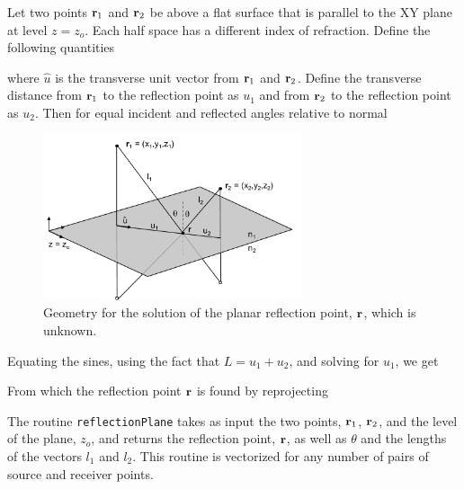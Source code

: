 Let two points $\mathbf{r}_1$ and $\mathbf{r}_2$ be above a flat surface that is parallel to the XY plane at level $z = z_o$. Each half space has a different index of refraction. Define the following quantities 

\noindent where $\hat{u}$ is the transverse unit vector from $\mathbf{r}_1$ and $\mathbf{r}_2$. Define the transverse distance from $\mathbf{r}_1$ to the reflection point as $u_1$ and from $\mathbf{r}_2$ to the reflection point as $u_2$.  Then for equal incident and reflected angles relative to normal

\begin{figure}[h] 
   \centering
   \includegraphics[width=3in]{ReflectionRefraction/Figures/reflectionPlane} 
   \caption{Geometry for the solution of the planar reflection point, $\mathbf{r}$, which is unknown.}
\end{figure}

Equating the sines, using the fact that $L = u_1 +u_2$, and solving for $u_1$, we get

From which the reflection point $\mathbf{r}$ is found by reprojecting

The routine \texttt{reflectionPlane} takes as input the two points, $\mathbf{r}_1$, $\mathbf{r}_2$, and the level of the plane, $z_o$, and returns the reflection point, $\mathbf{r}$, as well as $\theta$ and the lengths of the vectors $l_1$ and $l_2$.  This routine is vectorized for any number of pairs of source and receiver points.  


